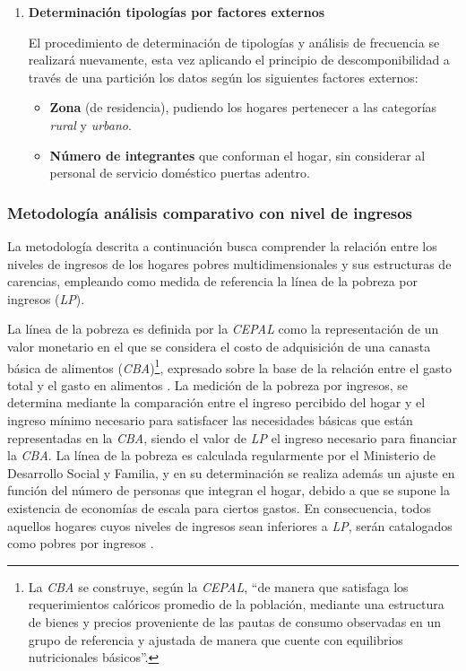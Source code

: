 \documentclass[12pt,letterpaper,spanish]{article}
\begin{document}
\begin{enumerate}
\item \textbf{Determinación tipologías por factores externos}

El procedimiento de determinación de tipologías y análisis de frecuencia se realizará nuevamente, esta vez  aplicando el principio de descomponibilidad a través de una partición los datos según los siguientes factores externos:

    \begin{itemize}
        \item  \textbf{Zona} (de residencia), pudiendo los hogares pertenecer a las categorías \textit{rural} y \textit{urbano}. 
        \item \textbf{Número de integrantes} que conforman el hogar, sin considerar al personal de servicio doméstico puertas adentro. 
    \end{itemize}
\end{enumerate}


\subsubsection{Metodología análisis comparativo con nivel de ingresos}

La metodología descrita a continuación busca comprender la relación entre los niveles de ingresos de los hogares pobres multidimensionales y sus estructuras de carencias, empleando como medida de referencia la línea de la pobreza por ingresos (\textit{LP}). 

La línea de la pobreza es definida por la \textit{CEPAL} como la representación de un valor monetario en el que se considera el costo de adquisición de una canasta básica de alimentos (\textit{CBA})\footnote{La \textit{CBA} se construye, según la \textit{CEPAL},  ``de manera que satisfaga los requerimientos calóricos promedio de la población, mediante una estructura de bienes y precios proveniente de las pautas de consumo observadas en un grupo de referencia y ajustada de manera que cuente con equilibrios nutricionales básicos''\cite{CEPAL2018MedicionResultados}.}, expresado sobre la base de la relación entre el gasto total y el gasto en alimentos \cite{CEPAL2018MedicionResultados}. La medición de la pobreza por ingresos, se determina mediante la comparación entre el ingreso percibido del hogar y el ingreso mínimo necesario para satisfacer las necesidades básicas que están representadas en la \textit{CBA}, siendo el valor de \textit{LP} el ingreso necesario para financiar la \textit{CBA}. La línea de la pobreza es calculada regularmente por el Ministerio de Desarrollo Social y Familia, y en su determinación se realiza además un ajuste en función del número de personas que integran el hogar, debido a que se supone la existencia de economías de escala para ciertos gastos. En consecuencia, todos aquellos hogares cuyos niveles de ingresos sean inferiores a \textit{LP}, serán catalogados como pobres por ingresos \cite{CEPAL2018Medicion2017}.
\end{document}
